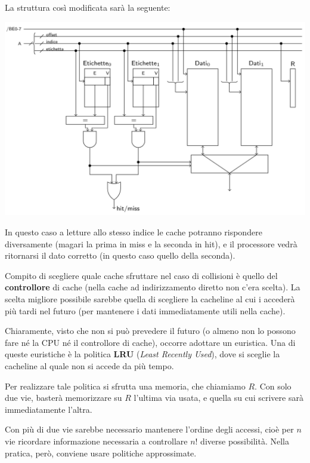 \documentclass[a4paper,11pt]{article}
\begin{document}
\noindent
\begin{minipage}{\textwidth}
La struttura così modificata sarà la seguente:
\begin{center}
	\includegraphics[scale = 0.455]{../figures/cache_associativa.png}
\end{center}
\end{minipage}

In questo caso a letture allo stesso indice le cache potranno rispondere diversamente (magari la prima in miss e la seconda in hit), e il processore vedrà ritornarsi il dato corretto (in questo caso quello della seconda).

Compito di scegliere quale cache sfruttare nel caso di collisioni è quello del \textbf{controllore} di cache (nella cache ad indirizzamento diretto non c'era scelta). 
La scelta migliore possibile sarebbe quella di scegliere la cacheline al cui i accederà più tardi nel futuro (per mantenere i dati immediatamente utili nella cache).

Chiaramente, visto che non si può prevedere il futuro (o almeno non lo possono fare né la CPU né il controllore di cache), occorre adottare un euristica.
Una di queste euristiche è la politica \textbf{LRU} (\textit{Least Recently Used}), dove si sceglie la cacheline al quale non si accede da più tempo.

Per realizzare tale politica si sfrutta una memoria, che chiamiamo $R$.
Con solo due vie, basterà memorizzare su $R$ l'ultima via usata, e quella su cui scrivere sarà immediatamente l'altra.

Con più di due vie sarebbe necessario mantenere l'ordine degli accessi, cioè per $n$ vie ricordare informazione necessaria a controllare $n!$ diverse possibilità.
Nella pratica, però, conviene usare politiche approssimate.
\end{document}

